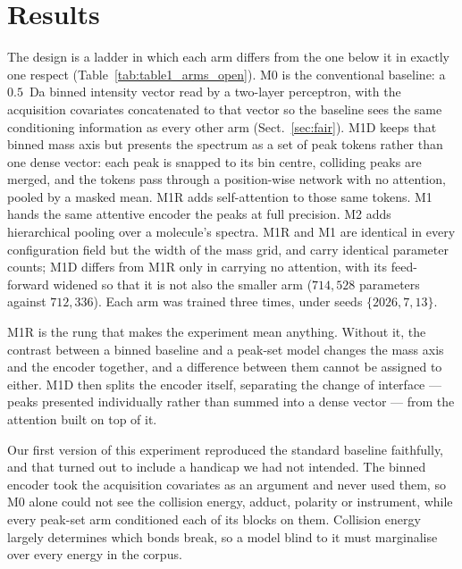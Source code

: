 \section*{Results}

The design is a ladder in which each arm differs from the one below it in exactly
one respect (Table~\ref{tab:table1_arms_open}). M0 is the conventional baseline: a
$0.5$~Da binned intensity vector read by a two-layer perceptron, with the
acquisition covariates concatenated to that vector so the baseline sees the same
conditioning information as every other arm (Sect.~\ref{sec:fair}). M1D keeps that binned mass axis but
presents the spectrum as a set of peak tokens rather than one dense vector: each
peak is snapped to its bin centre, colliding peaks are merged, and the tokens pass
through a position-wise network with no attention, pooled by a masked mean. M1R
adds self-attention to those same tokens. M1 hands the same attentive encoder the
peaks at full precision. M2 adds hierarchical pooling over a molecule's spectra. M1R and M1 are identical in every configuration field but
the width of the mass grid, and carry identical parameter counts; M1D differs from
M1R only in carrying no attention, with its feed-forward widened so that it is not
also the smaller arm ($714{,}528$ parameters against $712{,}336$). Each arm was
trained three times, under seeds $\{2026, 7, 13\}$.

M1R is the rung that makes the experiment mean anything. Without it, the contrast
between a binned baseline and a peak-set model changes the mass axis and the encoder
together, and a difference between them cannot be assigned to either. M1D then
splits the encoder itself, separating the change of interface --- peaks presented
individually rather than summed into a dense vector --- from the attention built on
top of it.



\label{sec:fair}
Our first version of this experiment reproduced the standard baseline faithfully,
and that turned out to include a handicap we had not intended. The binned encoder
took the acquisition covariates as an argument and never used them, so M0 alone
could not see the collision energy, adduct, polarity or instrument, while every
peak-set arm conditioned each of its blocks on them. Collision energy largely
determines which bonds break, so a model blind to it must marginalise over every
energy in the corpus.

